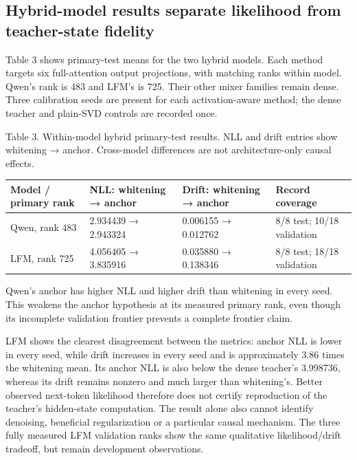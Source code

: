 \documentclass[conference]{IEEEtran}
\begin{document}
\subsection{Hybrid-model results separate likelihood from teacher-state fidelity}
Table 3 shows primary-test means for the two hybrid models. Each method targets six full-attention output projections, with matching ranks within model. Qwen's rank is 483 and LFM's is 725. Their other mixer families remain dense. Three calibration seeds are present for each activation-aware method; the dense teacher and plain-SVD controls are recorded once.\par\smallskip
Table 3. Within-model hybrid primary-test results. NLL and drift entries show whitening → anchor. Cross-model differences are not architecture-only causal effects.\par\smallskip
{\scriptsize\setlength{\tabcolsep}{2pt}
\noindent\begin{tabular}{@{}p{}p{}p{}p{}@{}}\toprule
Model / primary rank & NLL: whitening → anchor & Drift: whitening → anchor & Record coverage \\
\midrule
Qwen, rank 483 & 2.934439 → 2.943324 & 0.006155 → 0.012762 & 8/8 test; 10/18 validation \\
LFM, rank 725 & 4.056405 → 3.835916 & 0.035880 → 0.138346 & 8/8 test; 18/18 validation \\
\bottomrule\end{tabular}}\par\medskip
Qwen's anchor has higher NLL and higher drift than whitening in every seed. This weakens the anchor hypothesis at its measured primary rank, even though its incomplete validation frontier prevents a complete frontier claim.\par\smallskip
LFM shows the clearest disagreement between the metrics: anchor NLL is lower in every seed, while drift increases in every seed and is approximately 3.86 times the whitening mean. Its anchor NLL is also below the dense teacher's 3.998736, whereas its drift remains nonzero and much larger than whitening's. Better observed next-token likelihood therefore does not certify reproduction of the teacher's hidden-state computation. The result alone also cannot identify denoising, beneficial regularization or a particular causal mechanism. The three fully measured LFM validation ranks show the same qualitative likelihood/drift tradeoff, but remain development observations.\par\smallskip
\end{document}

